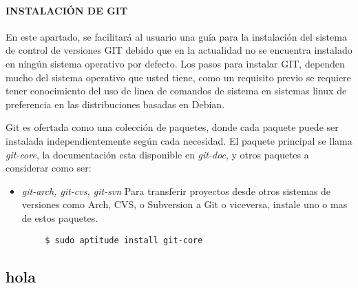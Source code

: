 \paragraph{INSTALACIÓN DE GIT}

En este apartado, se facilitará al usuario una guía para la instalación del sistema de control de versiones GIT debido que en la actualidad no se encuentra instalado en ningún sistema operativo por defecto. Los pasos para instalar GIT, dependen mucho del sistema operativo que usted tiene, como un requisito previo se requiere tener conocimiento del uso de linea de comandos de sistema en sistemas linux de preferencia en las distribuciones basadas en Debian.

Git es ofertada como una colección de paquetes, donde cada paquete puede ser instalada independientemente según cada necesidad. El paquete principal se llama \textit{git-core}, la documentación esta disponible en \textit{git-doc}, y otros paquetes a considerar como ser:

\begin{itemize}
 \item \textit{git-arch, git-cvs, git-svn}
Para transferir proyectos desde otros sistemas de versiones como Arch, CVS, o Subversion a Git o viceversa,
instale uno o mas de estos paquetes.

\end{itemize}


\begin{proc}
	\begin{verbatim}
 		$ sudo aptitude install git-core
	\end{verbatim}
\end{proc}
\subsection{hola}
%
